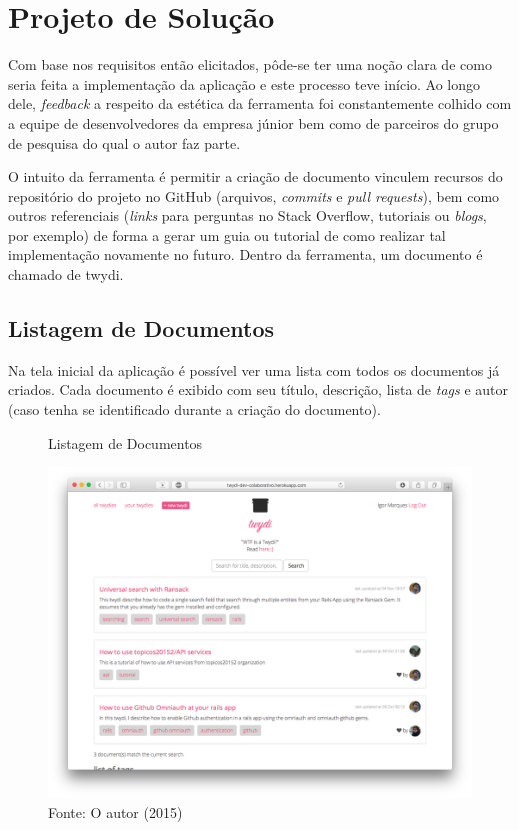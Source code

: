 \chapter{Projeto de Solução}

Com base nos requisitos então elicitados, pôde-se ter uma noção clara de como seria feita a implementação da aplicação e este processo teve início. Ao longo dele, \textit{feedback} a respeito da estética da ferramenta foi constantemente colhido com a equipe de desenvolvedores da empresa júnior bem como de parceiros do grupo de pesquisa do qual o autor faz parte.

O intuito da ferramenta é permitir a criação de documento vinculem recursos do repositório do projeto no GitHub (arquivos, \textit{commits} e \textit{pull requests}), bem como outros referenciais (\textit{links} para perguntas no Stack Overflow, tutoriais ou \textit{blogs}, por exemplo) de forma a gerar um guia ou tutorial de como realizar tal implementação novamente no futuro. Dentro da ferramenta, um documento é chamado de twydi.

\section{Listagem de Documentos}

Na tela inicial da aplicação é possível ver uma lista com todos os documentos já criados. Cada documento é exibido com seu título, descrição, lista de \textit{tags} e autor (caso tenha se identificado durante a criação do documento).

\begin{figure}[h]
	\centering
    \caption{Listagem de Documentos}
    \includegraphics[width=15cm]{Imagens/print-lista-1.png}
	\caption*{Fonte: O autor (2015)}
\end{figure}

